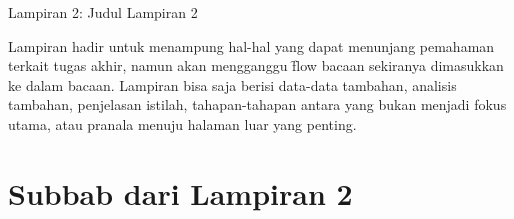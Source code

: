 \begin{flushright}
	Lampiran 2: Judul Lampiran 2
\end{flushright}
\label{appendix:sample}
Lampiran hadir untuk menampung hal-hal yang dapat menunjang pemahaman terkait tugas akhir, namun akan mengganggu \f{flow} bacaan sekiranya dimasukkan ke dalam bacaan.
Lampiran bisa saja berisi data-data tambahan, analisis tambahan, penjelasan istilah, tahapan-tahapan antara yang bukan menjadi fokus utama, atau pranala menuju halaman luar yang penting.

\section*{Subbab dari Lampiran 2}
\label{appendix:sampleSubchap}
